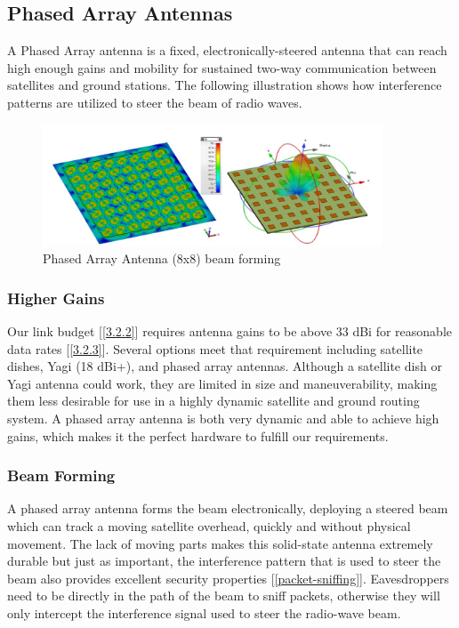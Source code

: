 \documentclass[11pt]{article}
\begin{document}
\subsection{Phased Array Antennas}

\noindent A Phased Array antenna is a fixed, electronically-steered antenna that can reach high enough gains and mobility for sustained two-way communication between satellites and ground stations. The following illustration shows how interference patterns are utilized to steer the beam of radio waves.

\begin{figure}[h]
    \centering
    \includegraphics[width=0.9\textwidth]{./images/rsz_phased_array.jpg} 
    \caption{Phased Array Antenna (8x8) beam forming \cite{Phased-Arrays}}
\end{figure}

\subsubsection{Higher Gains}

Our link budget [\ref{3.2.2}] requires antenna gains to be above 33 dBi for reasonable data rates [\ref{3.2.3}].
Several options meet that requirement including satellite dishes, Yagi (18 dBi+), and phased array antennas.
Although a satellite dish or Yagi antenna could work, they are limited in size and maneuverability, making them less desirable for use in a highly dynamic satellite and ground routing system.
A phased array antenna is both very dynamic and able to achieve high gains, which makes it the perfect hardware to fulfill our requirements.

\subsubsection{Beam Forming}

A phased array antenna forms the beam electronically, deploying a steered beam which can track a moving satellite overhead, quickly and without physical movement.
The lack of moving parts makes this solid-state antenna extremely durable but just as important, the interference pattern that is used to steer the beam also provides excellent security properties [\ref{packet-sniffing}]. Eavesdroppers need to be directly in the path of the beam to sniff packets, otherwise they will only intercept the interference signal used to steer the radio-wave beam.
\end{document}
